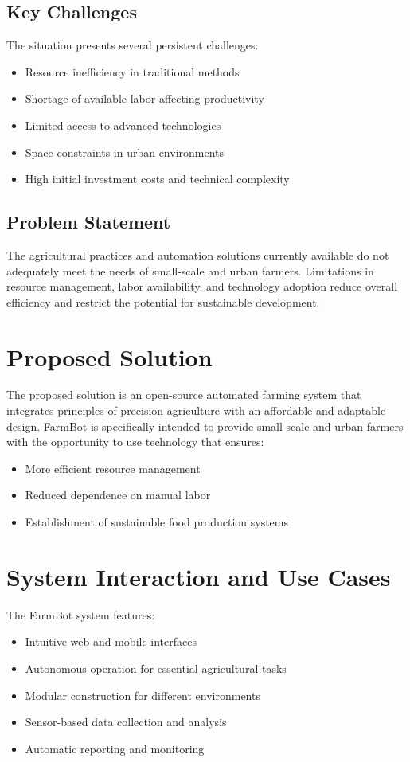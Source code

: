 \subsection{Key Challenges}

The situation presents several persistent challenges:
\begin{itemize}
\item Resource inefficiency in traditional methods
\item Shortage of available labor affecting productivity
\item Limited access to advanced technologies
\item Space constraints in urban environments
\item High initial investment costs and technical complexity
\end{itemize}

\subsection{Problem Statement}

The agricultural practices and automation solutions currently available do not adequately meet the needs of small-scale and urban farmers. Limitations in resource management, labor availability, and technology adoption reduce overall efficiency and restrict the potential for sustainable development.

\section{Proposed Solution}

The proposed solution is an open-source automated farming system that integrates principles of precision agriculture with an affordable and adaptable design. FarmBot is specifically intended to provide small-scale and urban farmers with the opportunity to use technology that ensures:
\begin{itemize}
\item More efficient resource management
\item Reduced dependence on manual labor
\item Establishment of sustainable food production systems
\end{itemize}

\section{System Interaction and Use Cases}

The FarmBot system features:
\begin{itemize}
\item Intuitive web and mobile interfaces
\item Autonomous operation for essential agricultural tasks
\item Modular construction for different environments
\item Sensor-based data collection and analysis
\item Automatic reporting and monitoring
\end{itemize}


